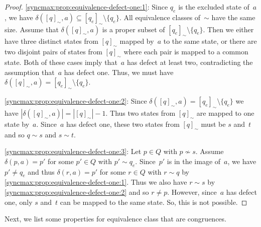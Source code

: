 \begin{proof}
	\ref{syncmax:prop:equivalence-defect-one:1}: Since $q_e$ is the excluded state of~$a$,
	we have $\delta([q]_{\sim}, a) \subseteq [q_e]_{\sim} \setminus \{q_e\}$.
	All equivalence classes of~$\sim$ have the same size.
	Assume that $\delta([q]_{\sim}, a)$ is a proper subset of $[q_e]_{\sim} \setminus\{q_e\}$.
	Then we either have three distinct states from $[q]_{\sim}$ mapped by~$a$ to the same state,
	or there are two disjoint pairs of states from $[q]_{\sim}$
	where each pair is mapped to a common state. Both of these cases
	imply that~$a$ has defect at least two, contradicting the assumption
	that~$a$ has defect one. Thus, we must have $\delta([q]_{\sim}, a) = [q_e]_{\sim} \setminus \{q_e\}$.
	
	\ref{syncmax:prop:equivalence-defect-one:2}: Since $\delta([q]_{\sim}, a) = [q_e]_{\sim} \setminus \{q_e\}$
	we have $| \delta([q]_{\sim}, a) | = | [q]_{\sim} | - 1$.
	Thus two states from $[q]_{\sim}$ are mapped to one state by~$a$.
	Since~$a$ has defect one, these two states from $[q]_{\sim}$ must be $s$ and~$t$
	and so $q \sim s$ and $s \sim t$.
	
	\ref{syncmax:prop:equivalence-defect-one:3}: 
	Let $p \in Q$ with $p \not\sim s$. 
	Assume $\delta(p, a) = p'$
	for some $p' \in Q$ with $p' \sim q_e$.
	Since~$p'$ is in the image of~$a$, we have $p' \ne q_e$ and thus $\delta(r, a) = p'$ for some $r \in Q$
	with $r \sim q$ by \cref{syncmax:prop:equivalence-defect-one:1}.
	Thus we also have $r \sim s$ by \cref{syncmax:prop:equivalence-defect-one:2}
	and so $r \ne p$.
	However, since~$a$ has defect one, only $s$ and~$t$ can be mapped
	to the same state. So, this is not possible.	
\end{proof}

Next, we list some properties for equivalence class that are congruences.

